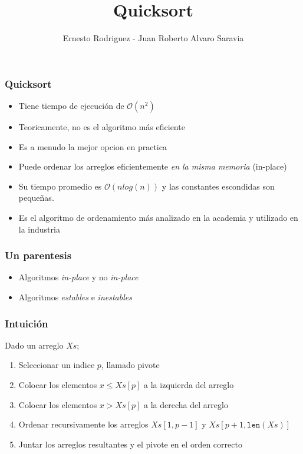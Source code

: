\documentclass{beamer}
\title[Quicksort]{Quicksort}
\author{Ernesto Rodriguez - Juan Roberto Alvaro Saravia}
\institute{
    Universidad Francisco Marroquin \\
    \medskip \textit{ernestorodriguez@ufm.edu - juanalvarado@ufm.edu}
}
\date[\today]{}
\begin{document}
\begin{frame}
\titlepage
\end{frame}

\begin{frame}
\frametitle{Quicksort}
\begin{itemize}
    \item{Tiene tiempo de ejecuci\'on de $\mathcal{O}(n^2)$}
    \item{Teoricamente, no es el algoritmo m\'as eficiente}
    \item{Es a menudo la mejor opcion en practica}
    \item{Puede ordenar los arreglos eficientemente \emph{en la misma memoria} (in-place)}
    \item{Su tiempo promedio es $\mathcal{O}(nlog(n))$ y las constantes escondidas son
    peque\~nas.}
    \item{Es el algoritmo de ordenamiento m\'as analizado en la academia y utilizado
    en la industria}
\end{itemize}
\end{frame}

\begin{frame}
\frametitle{Un parentesis}
\begin{itemize}
\item{Algoritmos \emph{in-place} y no \emph{in-place}}
\item{Algoritmos \emph{estables} e \emph{inestables}}
\end{itemize}
\end{frame}

\begin{frame}
\frametitle{Intuici\'on}
Dado un arreglo $Xs$;
\begin{enumerate}
    \item{Seleccionar un indice $p$, llamado pivote}
    \item{Colocar los elementos $x \leq Xs[p]$ a la izquierda del arreglo}
    \item{Colocar los elementos $x > Xs[p]$ a la derecha del arreglo}
    \item{Ordenar recursivamente los arreglos $Xs[1,p-1]$ y $Xs[p+1,\mathtt{len}(Xs)]$}
    \item{Juntar los arreglos resultantes y el pivote en el orden correcto}
\end{enumerate}

\end{frame}
\end{document}
